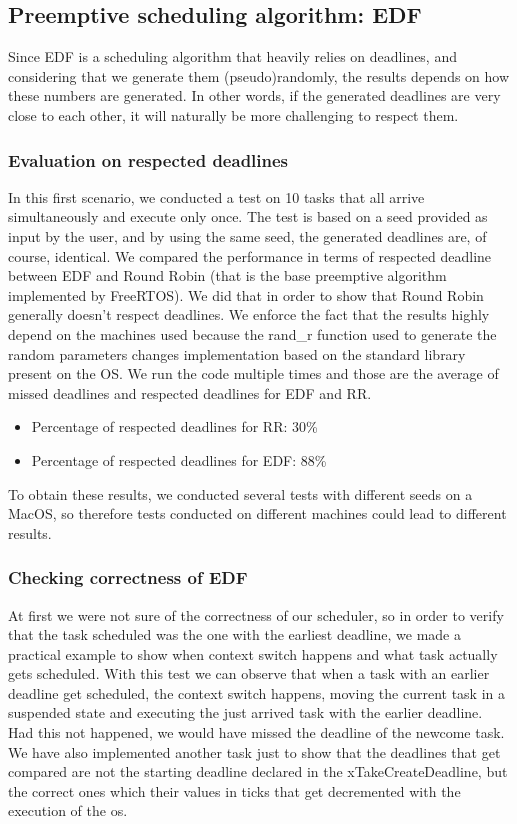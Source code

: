 \subsection{Preemptive scheduling algorithm: EDF}
Since EDF is a scheduling algorithm that heavily relies on deadlines, and considering that we generate them (pseudo)randomly, the results depends on how these numbers are generated. In other words, if the generated deadlines are very close to each other, it will naturally be more challenging to respect them.
\subsubsection{Evaluation on respected deadlines}
In this first scenario, we conducted a test on 10 tasks that all arrive simultaneously and execute only once. The test is based on a seed provided as input by the user, and by using the same seed, the generated deadlines are, of course, identical.
We compared the performance in terms of respected deadline between EDF and Round Robin (that is the base preemptive algorithm implemented by FreeRTOS). We did that in order to show that Round Robin generally doesn't respect deadlines. 
We enforce the fact that the results highly depend on the machines used because the rand\_r function used to generate the random parameters changes implementation based on the standard library present on the OS.
We run the code multiple times and those are the average of missed deadlines and respected deadlines for EDF and RR.
\begin{itemize}
    \item Percentage of respected deadlines for RR:  30\% 
    \item Percentage of respected deadlines for EDF: 88\% 
\end{itemize}
To obtain these results, we conducted several tests with different seeds on a MacOS, so therefore tests conducted on different machines could lead to different results.
\subsubsection{Checking correctness of EDF}
At first we were not sure of the correctness of our scheduler, so in order to verify that the task scheduled was the one with the earliest deadline, we made a practical example to show when context switch happens and what task actually gets scheduled.
With this test we can observe that when a task with an earlier deadline get scheduled, the context switch happens, moving the current task in a suspended state and executing the just arrived task with the earlier deadline. Had this not happened, we would have missed the deadline of the newcome task. We have also implemented another task just to show that the deadlines that get compared are not the starting deadline declared in the xTakeCreateDeadline, but the correct ones which their values in ticks that get decremented with the execution of the os.

